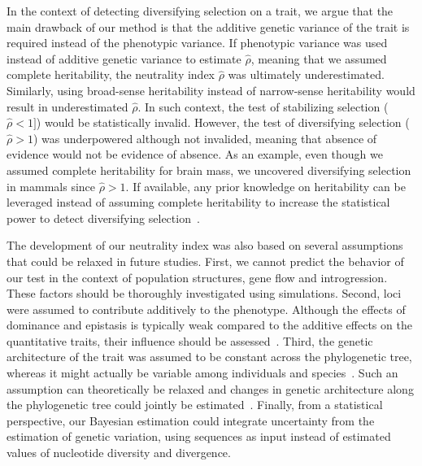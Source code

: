 \documentclass{article}
\newcommand{\EstNI}{\widehat{\rho}}
\begin{document}
In the context of detecting diversifying selection on a trait, we argue that the main drawback of our method is that the additive genetic variance of the trait is required instead of the phenotypic variance.
If phenotypic variance was used instead of additive genetic variance to estimate $\EstNI$, meaning that we assumed complete heritability, the neutrality index $\EstNI$ was ultimately underestimated.
Similarly, using broad-sense heritability instead of narrow-sense heritability would result in underestimated $\EstNI$.
In such context, the test of stabilizing selection ($\EstNI < 1]$) would be statistically invalid.
However, the test of diversifying selection ($\EstNI > 1$) was underpowered although not invalided, meaning that absence of evidence would not be evidence of absence.
As an example, even though we assumed complete heritability for brain mass, we uncovered diversifying selection in mammals since $\EstNI > 1$.
If available, any prior knowledge on heritability can be leveraged instead of assuming complete heritability to increase the statistical power to detect diversifying selection~\citep{hansen_heritability_2011, hansen_evolvability_2021}.

The development of our neutrality index was also based on several assumptions that could be relaxed in future studies.
First, we cannot predict the behavior of our test in the context of population structures, gene flow and introgression.
These factors should be thoroughly investigated using simulations.
Second, loci were assumed to contribute additively to the phenotype.
Although the effects of dominance and epistasis is typically weak compared to the additive effects on the quantitative traits, their influence should be assessed~\citep{hill_data_2008, crow_epistasis_2010}.
Third, the genetic architecture of the trait was assumed to be constant across the phylogenetic tree, whereas it might actually be variable among individuals and species~\citep{tung_genetic_2015, huber_conservatism_2015}.
Such an assumption can theoretically be relaxed and changes in genetic architecture along the phylogenetic tree could jointly be estimated~\citep{arnold_understanding_2008, hohenlohe_mipod_2008, kostikova_bridging_2016, gaboriau_multiplatform_2020}.
Finally, from a statistical perspective, our Bayesian estimation could integrate uncertainty from the estimation of genetic variation, using sequences as input instead of estimated values of nucleotide diversity and divergence.
\end{document}

